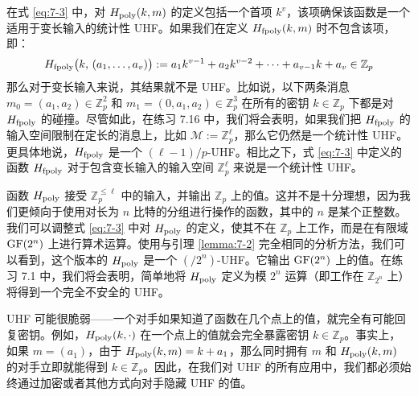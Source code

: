\begin{snote}
在式 \ref{eq:7-3} 中，对 $H_{\rm poly}(k,m)$ 的定义包括一个首项 $k^v$，该项确保该函数是一个适用于变长输入的统计性 UHF。如果我们在定义 $H_{\rm fpoly}(k,m)$ 时不包含该项，即： 
\begin{equation}\label{eq:7-5}
H_{\rm fpoly}\big(k,\,(a_1,\dots,a_v)\big):=a_1k^{v-1}+a_2k^{v-2}+\cdots+a_{v-1}k+a_v\in\mathbb{Z}_p
\end{equation}
那么对于变长输入来说，其结果就不是 UHF。比如说，以下两条消息 $m_0=(a_1,a_2)\in\mathbb{Z}^2_p$ 和 $m_1=(0,a_1,a_2)\in\mathbb{Z}^3_p$ 在所有的密钥 $k\in\mathbb{Z}_p$ 下都是对 $H_{\rm fpoly}$ 的碰撞。尽管如此，在练习 7.16 中，我们将会表明，如果我们把 $H_{\rm fpoly}$ 的输入空间限制在定长的消息上，比如 $\mathcal{M}:=\mathbb{Z}_p^\ell$，那么它仍然是一个统计性 UHF。更具体地说，$H_{\rm fpoly}$ 是一个 $(\ell-1)/p$-UHF。相比之下，式 \ref{eq:7-3} 中定义的函数 $H_{\rm fpoly}$ 对于包含变长输入的输入空间 $\mathbb{Z}_p^\ell$ 来说是一个统计性 UHF。
\end{snote}

\begin{remark}\label{remark:7-1}
函数 $H_{\rm poly}$ 接受 $\mathbb{Z}^{\leq\ell}_p$ 中的输入，并输出 $\mathbb{Z}_p$ 上的值。这并不是十分理想，因为我们更倾向于使用对长为 $n$ 比特的分组进行操作的函数，其中的 $n$ 是某个正整数。我们可以调整式 \ref{eq:7-3} 中对 $H_{\rm poly}$ 的定义，使其不在 $\mathbb{Z}_p$ 上工作，而是在有限域 ${\rm GF}(2^n)$ 上进行算术运算。使用与引理 \ref{lemma:7-2} 完全相同的分析方法，我们可以看到，这个版本的 $H_{\rm poly}$ 是一个 ${(/2^n)}$-UHF。它输出 ${\rm GF}(2^n)$ 上的值。在练习 7.1 中，我们将会表明，简单地将 $H_{\rm poly}$ 定义为模 $2^n$ 运算（即工作在 $\mathbb{Z}_{2^n}$ 上）将得到一个完全不安全的 UHF。
\end{remark}

\begin{snote}
UHF 可能很脆弱——一个对手如果知道了函数在几个点上的值，就完全有可能回复密钥。例如，$H_{\rm poly}(k,\cdot)$ 在一个点上的值就会完全暴露密钥 $k\in\mathbb{Z}_p$。事实上，如果 $m=(a_1)$，由于 $H_{\rm poly}(k,m)=k+a_1$，那么同时拥有 $m$ 和 $H_{\rm poly}(k,m)$ 的对手立即就能得到 $k\in\mathbb{Z}_p$。因此，在我们对 UHF 的所有应用中，我们都必须始终通过加密或者其他方式向对手隐藏 UHF 的值。
\end{snote}

